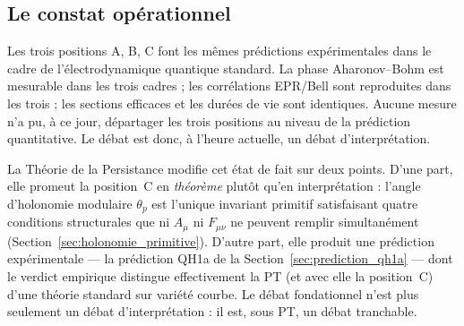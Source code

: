 \subsection{Le constat opérationnel}
\label{ssec:constat}

Les trois positions A, B, C font les mêmes prédictions
expérimentales dans le cadre de l'électrodynamique quantique
standard. La phase Aharonov--Bohm est mesurable dans les trois
cadres ; les corrélations EPR/Bell sont reproduites dans les
trois ; les sections efficaces et les durées de vie sont
identiques. Aucune mesure n'a pu, à ce jour, départager les trois
positions au niveau de la prédiction quantitative. Le débat est
donc, à l'heure actuelle, un débat d'interprétation.

La Théorie de la Persistance modifie cet état de fait sur deux
points. D'une part, elle promeut la position~C en \emph{théorème}
plutôt qu'en interprétation : l'angle d'holonomie modulaire
$\theta_p$ est l'unique invariant primitif satisfaisant quatre
conditions structurales que ni $A_\mu$ ni $F_{\mu\nu}$ ne peuvent
remplir simultanément (Section~\ref{sec:holonomie_primitive}).
D'autre part, elle produit une prédiction expérimentale --- la
prédiction QH1a de la Section~\ref{sec:prediction_qh1a} --- dont
le verdict empirique distingue effectivement la PT (et avec elle
la position~C) d'une théorie standard sur variété courbe. Le
débat fondationnel n'est plus seulement un débat
d'interprétation : il est, sous PT, un débat tranchable.
